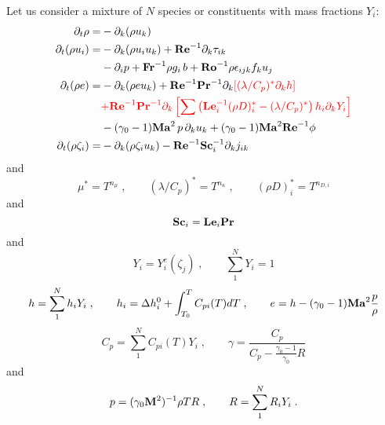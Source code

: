 Let us consider a mixture of $N$ species or constituents with mass fractions $Y_i$:
\begin{subequations}
    \begin{align}
        \partial_t \rho       =& -\partial_k (\rho u_k)                                                \\
        \partial_t (\rho u_i) =& -\partial_k (\rho u_i u_k )+\mathrm{\bf Re}^{-1}\partial_k \tau_{ik}  \nonumber\\
        & -\partial_i p +\mathrm{\bf Fr}^{-1} \rho g_i\,b +\mathrm{\bf Ro}^{-1}\rho\epsilon_{ijk} f_ku_j                                     \\
        \partial_t (\rho e)   =& -\partial_k (\rho e u_k )+\mathrm{\bf Re}^{-1}\mathrm{\bf Pr}^{-1}\partial_k\color{red}{\left[(\lambda/C_p)^{*}\partial_kh\right]}\nonumber\\
        & \color{red}{+\mathrm{\bf Re}^{-1}\mathrm{\bf Pr}^{-1} \partial_k\left[\sum\left(\mathrm{\bf Le}_i^{-1}(\rho D)_i^*
        -(\lambda/C_p)^*\right)h_i \partial_k  Y_i\right]}                                  \nonumber\\
        & -(\gamma_0-1)\mathrm{\bf Ma}^2\,p\, \partial_k u_k  + (\gamma_0-1)\mathrm{\bf Ma}^2\mathrm{\bf Re}^{-1}\phi                 \\
        \partial_t (\rho \zeta_i)=& -\partial_k (\rho \zeta_i u_k) -\mathrm{\bf Re}^{-1}\mathrm{\bf Sc}_i^{-1} \partial_k j_{ik}
    \end{align}
\end{subequations}
and
\begin{equation}
    \mu^{*} = T^{n_\mu}\;,\qquad (\lambda/C_p)^{*} = T^{n_\kappa} \;,\qquad (\rho
    D)_i^{*} = T^{n_{D,i}}
\end{equation}
and
\begin{equation}
    \mathrm{\bf Sc}_i = \mathrm{\bf Le}_i \mathrm{\bf Pr}
\end{equation}
and
\begin{equation}
    Y_i = Y^e_i(\zeta_j)\;, \qquad \sum^N_1 Y_i=1
\end{equation}
\begin{equation}
    h = \sum^N_1 h_{i} Y_i \;,\qquad h_{i} = \Delta h^0_i + \int^{T}_{T_0}
    C_{pi}(T) dT\;,\qquad e = h - (\gamma_0-1)\mathrm{\bf Ma}^2\frac{p}{\rho}
\end{equation}
\begin{equation}
    C_p = \sum^N_1 C_{pi}(T) Y_i\;,\qquad
    \gamma = \frac{C_p}{C_p-\frac{\gamma_0-1}{\gamma_0}R}
\end{equation}
and
\begin{equation}
    p = (\gamma_0 \mathrm{\bf M}^2)^{-1}\rho T R \;,\qquad
    R =\sum^N_1 R_iY_i\;.
\end{equation}
